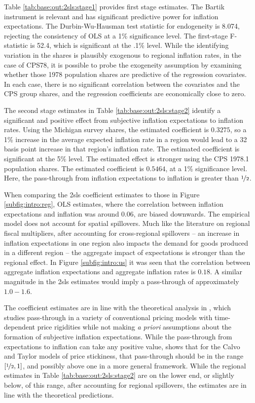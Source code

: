 \documentclass[12pt]{article}
\begin{document}
Table \ref{tab:base:out:2sls:stage1} provides first stage estimates. The Bartik instrument is relevant and has significant predictive power for inflation expectations. The Durbin-Wu-Hausman test statistic for endogeneity is 8.074, rejecting the consistency of OLS at a 1\% significance level. The first-stage F-statistic is 52.4, which is significant at the .1\% level. While the identifying variation in the shares is plausibly exogenous to regional inflation rates, in the case of CPS78, it is possible to probe the exogeneity assumption by examining whether those 1978 population shares are predictive of the regression covariates. In each case, there is no significant correlation between the covariates and the CPS group shares, and the regression coefficients are economically close to zero.

The second stage estimates in Table \ref{tab:base:out:2sls:stage2} identify a significant and positive effect from subjective inflation expectations to inflation rates. Using the Michigan survey shares, the estimated coefficient is $0.3275$, so a 1\% increase in the average expected inflation rate in a region would lead to a 32 basis point increase in that region's inflation rate. The estimated coefficient is significant at the 5\% level. The estimated effect is stronger using the CPS 1978.1 population shares. The estimated coefficient is $0.5464$, at a 1\% significance level. Here, the pass-through from inflation expectations to inflation is greater than $\nicefrac{1}{2}$.  

When comparing the 2sls coefficient estimates to those in Figure \ref{subfig:intro:reg}, OLS estimates, where the correlation between inflation expectations and inflation was around $0.06$, are biased downwards. The empirical model does not account for spatial spillovers. Much like the literature on regional fiscal multipliers, after accounting for cross-regional spillovers -- an increase in inflation expectations in one region also impacts the demand for goods produced in a different region -- the aggregate impact of expectations is stronger than the regional effect. In Figure \ref{subfig:intro:us} it was seen that the correlation between aggregate inflation expectations and aggregate inflation rates is $0.18$. A similar magnitude in the 2sls estimates would imply a pass-through of approximately $1.0-1.6$.  

The coefficient estimates are in line with the theoretical analysis in \cite{Werning:expectsWP}, which studies pass-through in a variety of conventional pricing models with time-dependent price rigidities while not making \emph{a priori} assumptions about the formation of subjective inflation expectations. While the pass-through from expectations to inflation can take any positive value, \cite{Werning:expectsWP} shows that for the Calvo and Taylor models of price stickiness, that pass-through should be in the range $\left[\nicefrac{1}{2},1\right]$, and possibly above one in a more general framework. While the regional estimates in Table \ref{tab:base:out:2sls:stage2} are on the lower end, or slightly below, of this range, after accounting for regional spillovers, the estimates are in line with the theoretical predictions.
\end{document}
